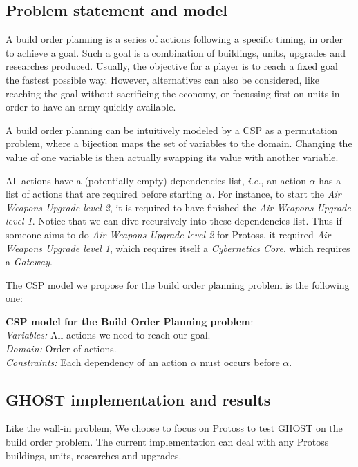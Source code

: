 \documentclass[journal]{IEEEtran}
\newcommand{\csp}{\textsc{CSP}\xspace}
\newcommand{\ghost}{\textsc{GHOST}\xspace}
\newcommand{\ie}{\textit{i.e.}}
\newcommand{\modelcsp}[4]%
{ \begin{trivlist}
  \item[]%
    \textbf{CSP model for #1}:\\
    \textit{Variables:} #2\\
    \textit{Domain:} #3\\
    \textit{Constraints:} #4
  \end{trivlist}%
}
\begin{document}
\subsection{Problem statement and model}
A build  order planning is  a series  of actions following  a specific
timing, in order  to achieve a goal.  Such a goal is  a combination of
buildings,  units,  upgrades  and researches  produced.  Usually,  the
objective for a  player is to reach a fixed  goal the fastest possible
way. However, alternatives  can also be considered,  like reaching the
goal without sacrificing  the economy, or focussing first  on units in
order to have an army quickly available.

A  build order  planning can  be intuitively  modeled by  a \csp  as a
permutation problem,  where a bijection  maps the set of  variables to
the  domain. Changing  the  value  of one  variable  is then  actually
swapping its value with another variable.

All  actions have  a (potentially  empty) dependencies  list, \ie,  an
action  $\alpha$  has a  list  of  actions  that are  required  before
starting  $\alpha$.  For  instance, to  start the  \textit{Air Weapons
  Upgrade level  2}, it is  required to have finished  the \textit{Air
  Weapons Upgrade level  1}. Notice that we can  dive recursively into
these  dependencies  list. Thus  if  someone  aims to  do  \textit{Air
  Weapons  Upgrade  level  2}  for Protoss,  it  required  \textit{Air
  Weapons    Upgrade   level    1},    which    requires   itself    a
\textit{Cybernetics Core}, which requires a \textit{Gateway}.

The \csp model we propose for  the build order planning problem is the
following one:

\modelcsp{the Build Order Planning problem}%
{All actions we need to reach our goal.}%
{Order of actions.}%
{Each dependency of an action $\alpha$ must occurs before $\alpha$.}

\subsection{\ghost implementation and results}

Like the wall-in problem, We choose to focus on Protoss to test \ghost
on the build  order problem. The current implementation  can deal with
any Protoss buildings, units, researches and upgrades.
\end{document}
